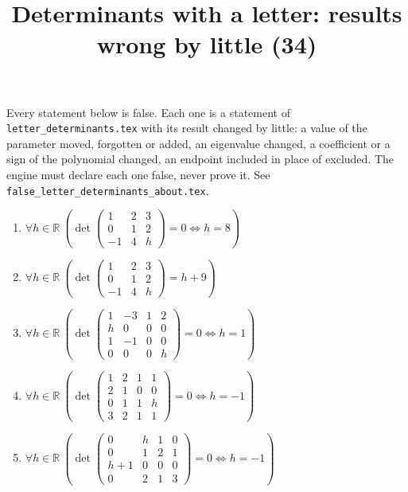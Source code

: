 \documentclass[11pt,a4paper]{article}
\title{Determinants with a letter: results wrong by little (34)}
\author{}
\date{}
\begin{document}
\maketitle
Every statement below is false. Each one is a statement of \texttt{letter\_determinants.tex} with its result changed by little: a value of the parameter moved, forgotten or added, an eigenvalue changed, a coefficient or a sign of the polynomial changed, an endpoint included in place of excluded. The engine must declare each one false, never prove it. See \texttt{false\_letter\_determinants\_about.tex}.

\begin{enumerate}
\item $\displaystyle \forall h \in \mathbb{R}\ \left( \det \begin{pmatrix} 1 & 2 & 3 \\ 0 & 1 & 2 \\ -1 & 4 & h \end{pmatrix} = 0 \iff h = 8 \right)$
\item $\displaystyle \forall h \in \mathbb{R}\ \left( \det \begin{pmatrix} 1 & 2 & 3 \\ 0 & 1 & 2 \\ -1 & 4 & h \end{pmatrix} = h + 9 \right)$
\item $\displaystyle \forall h \in \mathbb{R}\ \left( \det \begin{pmatrix} 1 & -3 & 1 & 2 \\ h & 0 & 0 & 0 \\ 1 & -1 & 0 & 0 \\ 0 & 0 & 0 & h \end{pmatrix} = 0 \iff h = 1 \right)$
\item $\displaystyle \forall h \in \mathbb{R}\ \left( \det \begin{pmatrix} 1 & 2 & 1 & 1 \\ 2 & 1 & 0 & 0 \\ 0 & 1 & 1 & h \\ 3 & 2 & 1 & 1 \end{pmatrix} = 0 \iff h = -1 \right)$
\item $\displaystyle \forall h \in \mathbb{R}\ \left( \det \begin{pmatrix} 0 & h & 1 & 0 \\ 0 & 1 & 2 & 1 \\ h + 1 & 0 & 0 & 0 \\ 0 & 2 & 1 & 3 \end{pmatrix} = 0 \iff h = -1 \right)$

\end{enumerate}
\end{document}
